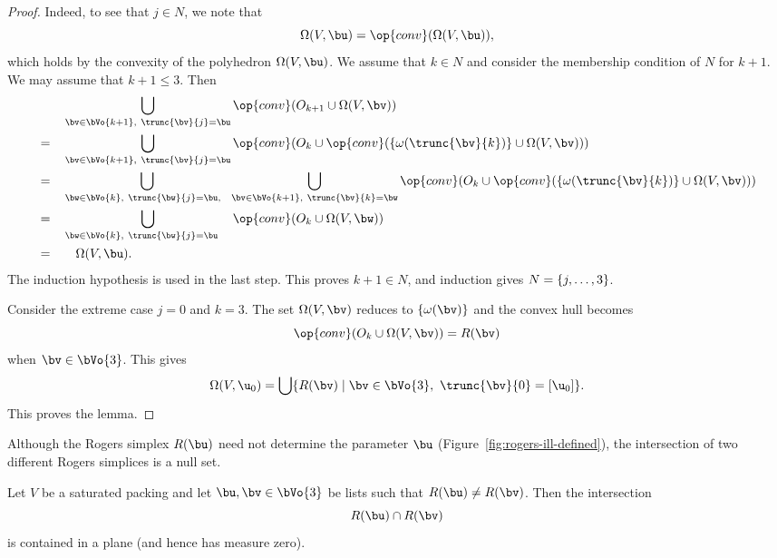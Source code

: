 \begin{cnl}
\begin{proof}
  Indeed, to see that $j\in N$, we note that
\[  
\Omega(V,\bu) = \op{conv}(\Omega(V,\bu)),
\] 
which holds by the convexity of the polyhedron $\Omega(V,\bu)$.  We
assume that $k\in N$ and consider the membership condition of $N$ for
$k+1$.  We may assume that $k+1\le 3$.  Then
\begin{alignat*}{4}
&\phantom{=}&&\bigcup _{\bv \in \bVo{k+1},~\trunc{\bv}{j}=\bu}
\op{conv}(O_{k+1} \cup\Omega(V,\bv))
\vspace{6pt}\\
&=&&\bigcup _{\bv \in \bVo{k+1},~\trunc{\bv}{j}=\bu}
\op{conv}(O_{k} \cup\op{conv}(\braced{\omega(\trunc{\bv}{k})}
\cup\Omega(V,\bv)))
\vspace{6pt}\\
&=&&\bigcup _{\bw\in \bVo{k},~\trunc{\bw}{j}=\bu,~~}
\bigcup_{\bv \in \bVo{k+1},~\trunc{\bv}{k}=\bw}
\op{conv}(O_{k} \cup\op{conv}(\braced{\omega(\trunc{\bv}{k})}
\cup\Omega(V,\bv)))
\vspace{6pt}\\
&=&&\bigcup _{\bw\in \bVo{k},~\trunc{\bw}{j}=\bu\phantom{+1}}
\op{conv}(O_{k} \cup \Omega(V,\bw)    )
\vspace{6pt}\\
&=&&\quad\Omega(V,\bu).
\end{alignat*}
The induction hypothesis is used in the last step.  
This proves $k+1\in N$, and induction gives $N=\{j,\ldots,3\}$.

Consider the extreme case $j=0$ and $k=3$.  The set $\Omega(V,\bv)$
reduces to $\braced{\omega(\bv)}$ and the convex hull becomes
\[  
\op{conv}(O_{k}\cup \Omega(V,\bv)) = R(\bv)
\] 
when $\bv\in \bVo{3}$.
This gives
\begin{equation} 
\Omega(V,\u_0) = 
\bigcup \setcomp{ R(\bv) }{ \bv\in \bVo{3},~\trunc{\bv}{0} =[\u_0]}.
\end{equation}
This proves the lemma.
\end{proof}

\figELMXAFH %

Although the Rogers simplex $R(\bu)$ need not determine the parameter
$\bu$ (Figure~\ref{fig:rogers-ill-defined}), the intersection of two
different Rogers simplices is a null set.

\begin{lemma}
\label{lemma:R-inter} 
%
Let $V$ be a saturated packing and let $\bu,\bv\in \bVo{3}$ be lists
such that $R(\bu)\ne R(\bv)$.  Then the intersection
\[  
R(\bu)\cap R(\bv)
\] 
is contained in a plane (and hence has measure zero).
\end{lemma}


\end{cnl}
